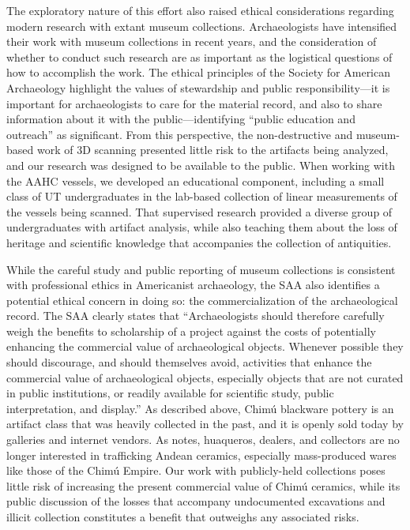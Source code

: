 \documentclass[]{interact}
\theoremstyle{plain}%
\theoremstyle{definition}
\theoremstyle{remark}
\begin{document}
The exploratory nature of this effort also raised ethical considerations
regarding modern research with extant museum collections. Archaeologists
have intensified their work with museum collections in recent years, and
the consideration of whether to conduct such research are as important
as the logistical questions of how to accomplish the work. The ethical
principles of the Society for American Archaeology highlight the values
of stewardship and public responsibility---it is important for
archaeologists to care for the material record, and also to share
information about it with the public---identifying ``public education
and outreach'' as significant. From this perspective, the
non-destructive and museum-based work of 3D scanning presented little
risk to the artifacts being analyzed, and our research was designed to
be available to the public. When working with the AAHC vessels, we
developed an educational component, including a small class of UT
undergraduates in the lab-based collection of linear measurements of the
vessels being scanned. That supervised research provided a diverse group
of undergraduates with artifact analysis, while also teaching them about
the loss of heritage and scientific knowledge that accompanies the
collection of antiquities.

While the careful study and public reporting of museum collections is
consistent with professional ethics in Americanist archaeology, the SAA
also identifies a potential ethical concern in doing so: the
commercialization of the archaeological record. The SAA clearly states
that ``Archaeologists should therefore carefully weigh the benefits to
scholarship of a project against the costs of potentially enhancing the
commercial value of archaeological objects. Whenever possible they
should discourage, and should themselves avoid, activities that enhance
the commercial value of archaeological objects, especially objects that
are not curated in public institutions, or readily available for
scientific study, public interpretation, and display.'' As described
above, Chimú blackware pottery is an artifact class that was heavily
collected in the past, and it is openly sold today by galleries and
internet vendors. As \citet[22-23]{RN11153} notes, huaqueros, dealers,
and collectors are no longer interested in trafficking Andean ceramics,
especially mass-produced wares like those of the Chimú Empire. Our work
with publicly-held collections poses little risk of increasing the
present commercial value of Chimú ceramics, while its public discussion
of the losses that accompany undocumented excavations and illicit
collection constitutes a benefit that outweighs any associated risks.
\end{document}
